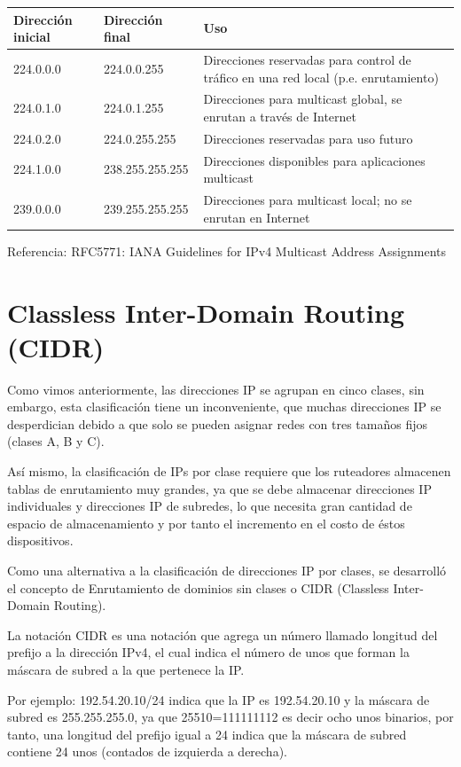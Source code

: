 \begin{center}
\small
\begin{tabularx}{\linewidth}{|X|X|X|}
\hline
Dirección inicial & Dirección final & Uso \\ \hline
224.0.0.0 & 224.0.0.255 & Direcciones reservadas para control de tráfico en una red local (p.e. enrutamiento) \\ \hline
224.0.1.0 & 224.0.1.255 & Direcciones para multicast global, se enrutan a través de Internet \\ \hline
224.0.2.0 & 224.0.255.255 & Direcciones reservadas para uso futuro \\ \hline
224.1.0.0 & 238.255.255.255 & Direcciones disponibles para aplicaciones multicast \\ \hline
239.0.0.0 & 239.255.255.255 & Direcciones para multicast local; no se enrutan en Internet \\ \hline
\end{tabularx}
\end{center}

Referencia: RFC5771: IANA Guidelines for IPv4 Multicast Address Assignments

\section{Classless Inter-Domain Routing (CIDR)}

Como vimos anteriormente, las direcciones IP se agrupan en cinco clases, sin embargo, esta clasificación tiene un inconveniente, que muchas direcciones IP se desperdician debido a que solo se pueden asignar redes con tres tamaños fijos (clases A, B y C).

Así mismo, la clasificación de IPs por clase requiere que los ruteadores almacenen tablas de enrutamiento muy grandes, ya que se debe almacenar direcciones IP individuales y direcciones IP de subredes, lo que necesita gran cantidad de espacio de almacenamiento y por tanto el incremento en el costo de éstos dispositivos.

Como una alternativa a la clasificación de direcciones IP por clases, se desarrolló el concepto de Enrutamiento de dominios sin clases o CIDR (Classless Inter-Domain Routing).

La notación CIDR es una notación que agrega un número llamado longitud del prefijo a la dirección IPv4, el cual indica el número de unos que forman la máscara de subred a la que pertenece la IP.

Por ejemplo: 192.54.20.10/24 indica que la IP es 192.54.20.10 y la máscara de subred es 255.255.255.0, ya que 25510=111111112 es decir ocho unos binarios, por tanto, una longitud del prefijo igual a 24 indica que la máscara de subred contiene 24 unos (contados de izquierda a derecha).

